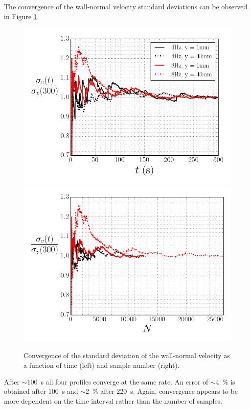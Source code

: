 \documentclass[12pt,oneside,a4paper]{article}
\begin{document}
The convergence of the wall-normal velocity standard deviations can be observed in Figure \ref{figure:experiments:timeDependence:RMSuy}.
%
\begin{figure}[!t]
\centering
\includegraphics[width=0.5\linewidth]{images/LDA_timeDependenceImages/uyRMSTConvergence.png}\hfill
\includegraphics[width=0.5\linewidth]{images/LDA_timeDependenceImages/uyRMSNConvergence.png}\\
\caption{Convergence of the standard deviation of the wall-normal velocity as a function of time (left) and sample number (right).}
\label{figure:experiments:timeDependence:RMSuy}
\end{figure}
%
After $\sim$\SI{100}{s} all four profiles converge at the same rate. An error of $\sim$\SI{4}{\%} is obtained after \SI{100}{s} and $\sim$\SI{2}{\%} after \SI{220}{s}. Again, convergence appears to be more dependent on the time interval rather than the number of samples.
\end{document}
